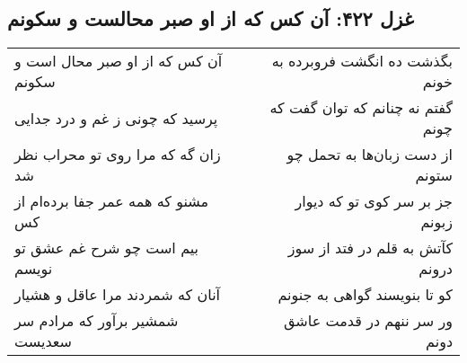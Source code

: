 \begin{center}
\section*{غزل ۴۲۲: آن کس که از او صبر محالست و سکونم}
\label{sec:422}
\begin{longtable}{l p{0.5cm} r}
آن کس که از او صبر محال است و سکونم
&&
بگذشت ده انگشت فروبرده به خونم
\\
پرسید که چونی ز غم و درد جدایی
&&
گفتم نه چنانم که توان گفت که چونم
\\
زان گه که مرا روی تو محراب نظر شد
&&
از دست زبان‌ها به تحمل چو ستونم
\\
مشنو که همه عمر جفا برده‌ام از کس
&&
جز بر سر کوی تو که دیوار زبونم
\\
بیم است چو شرح غم عشق تو نویسم
&&
کآتش به قلم در فتد از سوز درونم
\\
آنان که شمردند مرا عاقل و هشیار
&&
کو تا بنویسند گواهی به جنونم
\\
شمشیر برآور که مرادم سر سعدیست
&&
ور سر ننهم در قدمت عاشق دونم
\\
\end{longtable}
\end{center}
